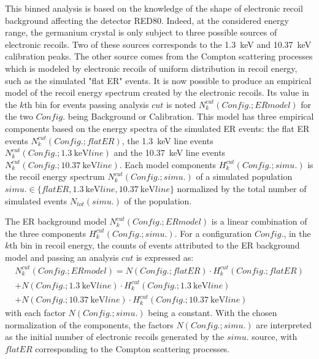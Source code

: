 This binned analysis is based on the knowledge of the shape of electronic recoil background affecting the detector RED80. Indeed, at the considered energy range, the germanium crystal is only subject to three possible sources of electronic recoils. Two of these sources corresponds to the \SI{1.3}{\kilo\eV} and \SI{10.37}{\kilo\eV} calibration peaks. The other source comes from the Compton scattering processes which is modeled by electronic recoils of uniform distribution in recoil energy, such as the simulated "flat ER" events. It is now possible to produce an empirical model of the recoil energy spectrum created by the electronic recoils. Its value in the $k$th bin for events passing analysis $cut$ is noted $N_k^{cut}(Config.; ER model)$ for the two $Config.$ being Background or Calibration. This model has three empirical components based on the energy spectra of the simulated ER events: the flat ER events $N_k^{cut}(Config.; flat ER)$, the \SI{1.3}{\kilo\eV} line events $N_k^{cut}(Config.; \SI{1.3}{\kilo\eV} line)$ and the \SI{10.37}{\kilo\eV} line events $N_k^{cut}(Config.; \SI{10.37}{\kilo\eV} line)$. Each model components $H_k^{cut}(Config.; simu.)$ is the recoil energy spectrum $N_k^{cut}(Config.; simu.)$ of a simulated population $simu. \in \{flat ER, \SI{1.3}{\kilo\eV} line, \SI{10.37}{\kilo\eV} line \}$ normalized by the total number of simulated events $N_{tot}(simu.)$ of the population. 

The ER background model $N_k^{cut}(Config.; ER model)$  is a linear combination of the three components $H_k^{cut}(Config.; simu.)$. For a configuration $Config.$, in the $k$th bin in recoil energy, the counts of events attributed to the ER background model and passing an analysis $cut$  is expressed as:
\begin{multline}
N_k^{cut}(Config.; ER model)
=
N(Config.; flat ER) \cdot H_k^{cut}(Config.; flat ER) \\
+ N(Config.; \SI{1.3}{\kilo\eV} line) \cdot H_k^{cut}(Config.; \SI{1.3}{\kilo\eV} line) \\
+ N(Config.; \SI{10.37}{\kilo\eV} line) \cdot H_k^{cut}(Config.; \SI{10.37}{\kilo\eV} line)
\end{multline}
with each factor $N(Config.; simu.)$ being a constant. With the chosen normalization of the components, the factors $N(Config.; simu.)$ are interpreted as the initial number of electronic recoils generated by the $simu.$ source, with $flatER$ corresponding to the Compton scattering processes.


